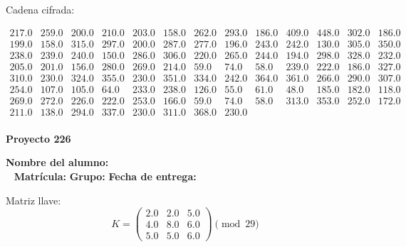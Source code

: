 \documentclass[12pt]{article}
\begin{document}
Cadena cifrada:
\begin{center}
$\begin{array}{lllllllllllll}
217.0 & 259.0 & 200.0 & 210.0 & 203.0 & 158.0 & 262.0 & 293.0 & 186.0 & 409.0 & 448.0 & 302.0 & 186.0\\
199.0 & 158.0 & 315.0 & 297.0 & 200.0 & 287.0 & 277.0 & 196.0 & 243.0 & 242.0 & 130.0 & 305.0 & 350.0\\
238.0 & 239.0 & 240.0 & 150.0 & 286.0 & 306.0 & 220.0 & 265.0 & 244.0 & 194.0 & 298.0 & 328.0 & 232.0\\
205.0 & 201.0 & 156.0 & 280.0 & 269.0 & 214.0 & 59.0 & 74.0 & 58.0 & 239.0 & 222.0 & 186.0 & 327.0\\
310.0 & 230.0 & 324.0 & 355.0 & 230.0 & 351.0 & 334.0 & 242.0 & 364.0 & 361.0 & 266.0 & 290.0 & 307.0\\
254.0 & 107.0 & 105.0 & 64.0 & 233.0 & 238.0 & 126.0 & 55.0 & 61.0 & 48.0 & 185.0 & 182.0 & 118.0\\
269.0 & 272.0 & 226.0 & 222.0 & 253.0 & 166.0 & 59.0 & 74.0 & 58.0 & 313.0 & 353.0 & 252.0 & 172.0\\
211.0 & 138.0 & 294.0 & 337.0 & 230.0 & 311.0 & 368.0 & 230.0\\
\end{array}$
\end{center}

\newpage


\textbf{Proyecto 226}

\textbf{Nombre del alumno:} \underline{\hspace{13cm}}\\\
\vspace{1cm}
\textbf{Matrícula:} \underline{\hspace{4cm}} \hspace{1cm}
\textbf{Grupo:} \underline{\hspace{2cm}}
\textbf{Fecha de entrega:} \underline{\hspace{2cm}}

\medskip

Matriz llave:
\[
K = \begin{pmatrix}
2.0 & 2.0 & 5.0\\
4.0 & 8.0 & 6.0\\
5.0 & 5.0 & 6.0
\end{pmatrix} \pmod{29}
\]
\end{document}
